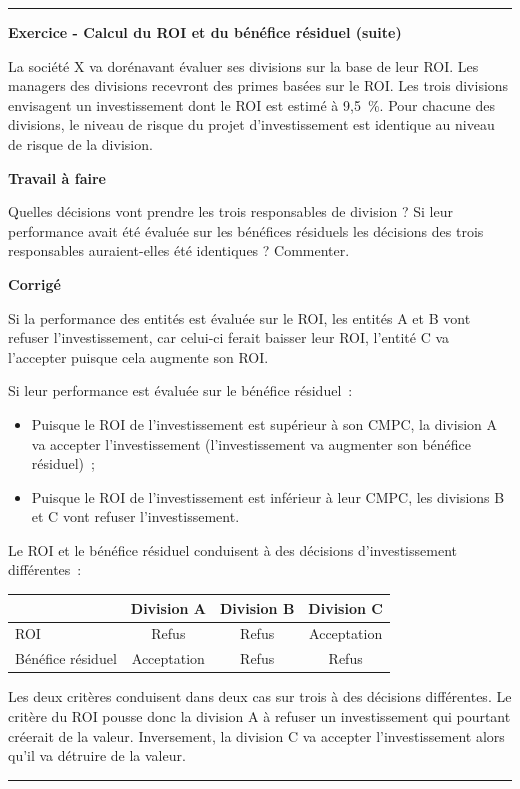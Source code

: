 \documentclass[oneside]{kaobook}
\begin{document}
\noindent\rule{\textwidth}{0.5pt}
\textbf{Exercice - Calcul du ROI et du bénéfice résiduel (suite)}

La société X va dorénavant évaluer ses divisions sur la base de leur ROI. Les managers des divisions recevront des primes basées sur le ROI. Les trois divisions envisagent un investissement dont le ROI est estimé à 9,5 \%. Pour chacune des divisions, le niveau de risque du projet d'investissement est identique au niveau de risque de la division.

\textbf{Travail à faire}

Quelles décisions vont prendre les trois responsables de division ? Si leur performance avait été évaluée sur les bénéfices résiduels les décisions des trois responsables auraient-elles été identiques ? Commenter. 

\textbf{Corrigé}

Si la performance des entités est évaluée sur le ROI, les entités A et B vont refuser l'investissement, car celui-ci ferait baisser leur ROI, l'entité C va l'accepter puisque cela augmente son ROI.

Si leur performance est évaluée sur le bénéfice résiduel :
\begin{itemize}
\item Puisque le ROI de l'investissement est supérieur à son CMPC, la division A va accepter l'investissement (l'investissement va augmenter son bénéfice résiduel) ;
\item Puisque le ROI de l'investissement est inférieur à leur CMPC, les divisions B et C vont refuser l'investissement.
\end{itemize}
Le ROI et le bénéfice résiduel conduisent à des décisions d'investissement différentes :
\begin{center}
\footnotesize
\begin{tabular}{l c c c}
 & Division A & Division B & Division C\\
\hline
ROI & Refus & Refus & Acceptation\\
Bénéfice résiduel & Acceptation & Refus & Refus\\
\end{tabular}
\end{center}
Les deux critères conduisent dans deux cas sur trois à des décisions différentes. Le critère du ROI pousse donc la division A à refuser un investissement qui pourtant créerait de la valeur. Inversement, la division C va accepter l'investissement alors qu'il va détruire de la valeur.

\noindent\rule{\textwidth}{0.5pt}
\end{document}

